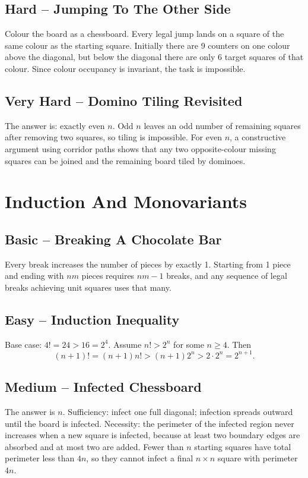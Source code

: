\documentclass[12pt]{article}
\begin{document}
\subsection*{Hard -- Jumping To The Other Side}
Colour the board as a chessboard. Every legal jump lands on a square
of the same colour as the starting square. Initially there are 9
counters on one colour above the diagonal, but below the diagonal
there are only 6 target squares of that colour. Since colour
occupancy is invariant, the task is impossible.

\subsection*{Very Hard -- Domino Tiling Revisited}
The answer is: exactly even $n$. Odd $n$ leaves an odd number of
remaining squares after removing two squares, so tiling is
impossible. For even $n$, a constructive argument using corridor
paths shows that any two opposite-colour missing squares can be
joined and the remaining board tiled by dominoes.

\section{Induction And Monovariants}

\subsection*{Basic -- Breaking A Chocolate Bar}
Every break increases the number of pieces by exactly 1. Starting
from 1 piece and ending with $nm$ pieces requires $nm-1$ breaks, and
any sequence of legal breaks achieving unit squares uses that many.

\subsection*{Easy -- Induction Inequality}
Base case: $4!=24>16=2^4$. Assume $n!>2^n$ for some $n\ge4$. Then
\[
    (n+1)!=(n+1)n!>(n+1)2^n>2\cdot2^n=2^{n+1}.
\]

\subsection*{Medium -- Infected Chessboard}
The answer is $n$. Sufficiency: infect one full diagonal; infection
spreads outward until the board is infected. Necessity: the perimeter
of the infected region never increases when a new square is infected,
because at least two boundary edges are absorbed and at most two are
added. Fewer than $n$ starting squares have total perimeter less than
$4n$, so they cannot infect a final $n\times n$ square with perimeter $4n$.
\end{document}
